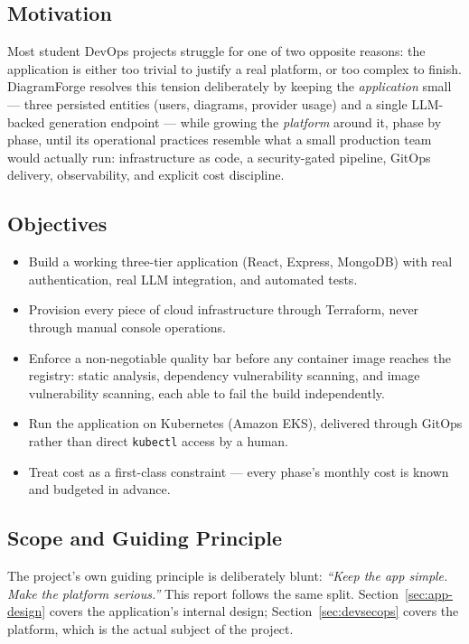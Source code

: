 \documentclass[11pt,a4paper]{article}
\begin{document}
\subsection{Motivation}
Most student DevOps projects struggle for one of two opposite reasons:
the application is either too trivial to justify a real platform, or too
complex to finish. DiagramForge resolves this tension deliberately by
keeping the \emph{application} small --- three persisted entities (users,
diagrams, provider usage) and a single LLM-backed generation endpoint ---
while growing the \emph{platform} around it, phase by phase, until its
operational practices resemble what a small production team would actually
run: infrastructure as code, a security-gated pipeline, GitOps delivery,
observability, and explicit cost discipline.

\subsection{Objectives}
\begin{itemize}[nosep]
    \item Build a working three-tier application (React, Express, MongoDB)
        with real authentication, real LLM integration, and automated tests.
    \item Provision every piece of cloud infrastructure through Terraform,
        never through manual console operations.
    \item Enforce a non-negotiable quality bar before any container image
        reaches the registry: static analysis, dependency vulnerability
        scanning, and image vulnerability scanning, each able to fail the
        build independently.
    \item Run the application on Kubernetes (Amazon EKS), delivered through
        GitOps rather than direct \texttt{kubectl} access by a human.
    \item Treat cost as a first-class constraint --- every phase's monthly
        cost is known and budgeted in advance.
\end{itemize}

\subsection{Scope and Guiding Principle}
The project's own guiding principle is deliberately blunt: \emph{``Keep the
app simple. Make the platform serious.''} This report follows the same
split. Section~\ref{sec:app-design} covers the application's internal
design; Section~\ref{sec:devsecops} covers the platform, which is the
actual subject of the project.
\end{document}

